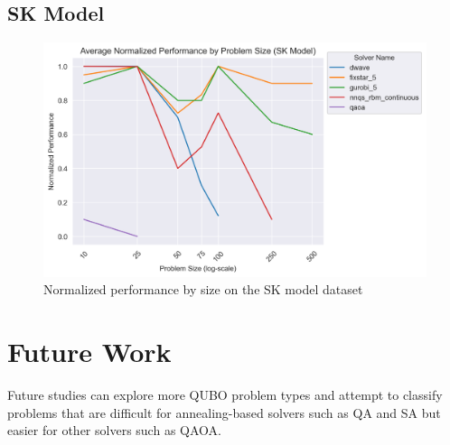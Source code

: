 \subsection{SK Model}
\begin{figure}[!h]
    \centering
    \includegraphics[width=1\linewidth]{images/skmodel_normalized_performance_all.png}
    \caption{Normalized performance by size on the SK model dataset}
    \label{all-skmodel-size}
\end{figure}

\section{Future Work}
Future studies can explore more QUBO problem types and attempt to classify problems that are difficult for annealing-based solvers such as QA and SA but easier for other solvers such as QAOA.